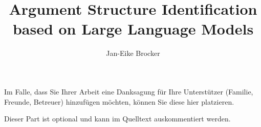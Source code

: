 \documentclass{hhuthesis}
\author{Jan-Eike Brocker}
\title{Argument Structure Identification based on Large Language Models}
\begin{document}
\frontmatter
\makefrontmatter

\begin{acknowledgements}
  Im Falle, dass Sie Ihrer Arbeit eine Danksagung für Ihre Unterstützer
  (Familie, Freunde, Betreuer)
  hinzufügen möchten, können Sie diese hier platzieren.

  Dieser Part ist optional und kann im Quelltext auskommentiert werden.
\end{acknowledgements}


\tableofcontents


\mainmatter








 \appendix
 



\backmatter

\listoffigures\thispagestyle{headings}

\listoftables\thispagestyle{headings}

\listofalgorithms\thispagestyle{headings}

\lstlistoflistings\thispagestyle{headings}

\clearpage

\end{document}
